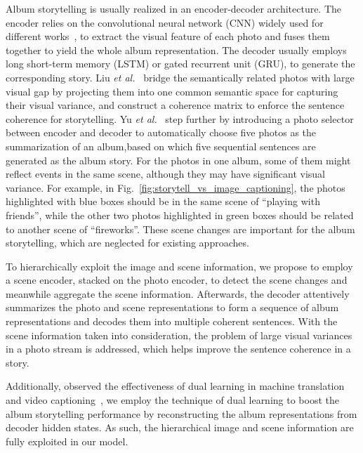 \documentclass[letterpaper]{article} \usepackage{aaai19}  \usepackage{times}  \usepackage{helvet}  \usepackage{courier}  \usepackage{url}  \usepackage{graphicx}  \usepackage{color}
\begin{document}
Album storytelling  is usually realized in an encoder-decoder architecture. The encoder relies on the convolutional neural network (CNN) widely used for different works~\cite{zhang2017learning,zhang2018intra,zhang2018long,ma2016learning,qi2018hedging}, to extract the visual feature of each photo and fuses them together to yield the whole album representation.
The decoder usually employs long short-term memory (LSTM) or gated recurrent unit (GRU), to generate the corresponding story.
Liu \textit{et al.}~\cite{liu2017let} bridge the semantically related photos with large visual gap by projecting them into one common semantic space for capturing their visual variance, and construct a coherence matrix to enforce the sentence coherence for storytelling. Yu \textit{et al.}~\cite{yu2017hierarchically} step further by introducing a photo selector between encoder and decoder to automatically choose five photos as the summarization of an album,based on which five sequential sentences are generated as the album story.
For the photos in one album, some of them might reflect events in the same scene, although they may have significant visual variance. For example, in Fig.~\ref{fig:storytell_vs_image_captioning}, the photos highlighted with blue boxes should be in the same scene of ``playing with friends'', while the other two photos highlighted in green boxes should be related to another scene of ``fireworks''. These  scene changes are important for the album storytelling, which are neglected for existing approaches.




To hierarchically exploit the image and scene information, we propose to employ a scene encoder, stacked on the photo encoder,  to detect the scene changes and meanwhile aggregate the scene information. Afterwards, the decoder attentively summarizes the photo and  scene representations to form a sequence of album representations and decodes them into multiple coherent sentences. With the scene information taken into consideration, the problem of large visual variances in a photo stream is addressed, which helps improve the sentence coherence in a story.


Additionally, observed the effectiveness of dual learning in machine translation~\cite{tu2017neural} and video captioning~\cite{wang2018reconstruction}, we employ the technique of dual learning to boost the album storytelling performance by
reconstructing the album representations from decoder hidden states.
As such, the hierarchical image and scene information are fully exploited in our model.
\end{document}

